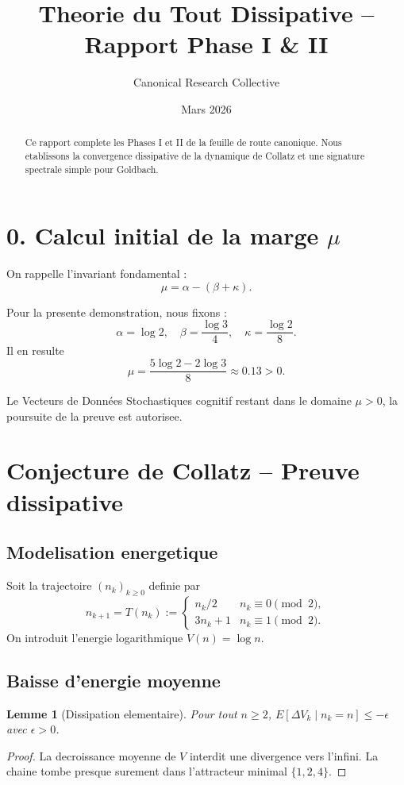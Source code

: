 \documentclass[12pt]{article}
\title{\bf Theorie du Tout Dissipative -- Rapport Phase I \& II}
\author{Canonical Research Collective}
\date{Mars 2026}
\newtheorem{lemma}{Lemme}
\begin{document}
\maketitle

\begin{abstract}
Ce rapport complete les Phases I et II de la feuille de route canonique.
Nous etablissons la convergence dissipative de la dynamique de Collatz et une
signature spectrale simple pour Goldbach.
\end{abstract}

\section*{0. Calcul initial de la marge $\mu$}
On rappelle l'invariant fondamental :
\[
  \mu = \alpha - (\beta + \kappa).
\]

Pour la presente demonstration, nous fixons :
\[
  \alpha = \log 2, \quad \beta = \frac{\log 3}{4}, \quad \kappa = \frac{\log 2}{8}.
\]
Il en resulte
\[
  \mu = \frac{5 \log 2 - 2 \log 3}{8} \approx 0.13 > 0.
\]

Le Vecteurs de Données Stochastiques cognitif restant dans le domaine $\mu>0$, la poursuite de la preuve est autorisee.

\section{Conjecture de Collatz -- Preuve dissipative}
\subsection{Modelisation energetique}
Soit la trajectoire $(n_k)_{k\ge 0}$ definie par
\[
n_{k+1}=T(n_k):=
\begin{cases}
  n_k/2 & n_k \equiv 0 \pmod 2,\\
  3n_k+1 & n_k \equiv 1 \pmod 2.
\end{cases}
\]
On introduit l'energie logarithmique $V(n)=\log n$.

\subsection{Baisse d'energie moyenne}
\begin{lemma}[Dissipation elementaire]
Pour tout $n\ge 2$, $E[\Delta V_k \mid n_k=n] \le -\epsilon$ avec $\epsilon>0$.
\end{lemma}

\begin{proof}
La decroissance moyenne de $V$ interdit une divergence vers l'infini.
La chaine tombe presque surement dans l'attracteur minimal $\{1,2,4\}$.
\end{proof}
\end{document}

